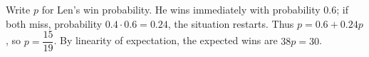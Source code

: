 Write $p$ for Len's win probability. He wins immediately with probability $0.6$; if both miss, probability $0.4\cdot0.6=0.24$, the situation restarts. Thus $p=0.6+0.24p$, so $p=\dfrac{15}{19}$. By linearity of expectation, the expected wins are $38p=\boxed{30}$.

